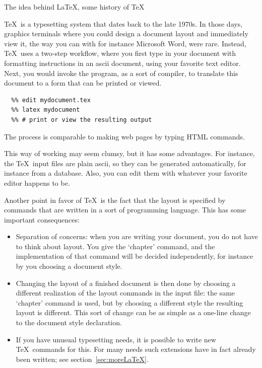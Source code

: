 
 {The idea behind \LaTeX, some history of \TeX}

\TeX\ is a typesetting system that dates back to the late 1970s. In
those days, graphics terminals where you could design a document layout
and immediately view it, the way you can with for instance Microsoft Word, were
rare.  Instead, \TeX\ uses a two-step workflow, where you first type
in your document with formatting instructions in an ascii document,
using your favorite text editor.
%
Next, you would invoke the
 program, as a sort of compiler, to translate this document to
a form that can be printed or viewed. 
\begin{verbatim}
  %% edit mydocument.tex
  %% latex mydocument
  %% # print or view the resulting output
\end{verbatim}
The process is comparable to
making web pages by typing HTML commands.

This way of working may seem clumsy, but
it has some advantages. For instance, the \TeX\ input files are plain
ascii, so they can be generated automatically, for instance
from a database. Also, you can edit them with whatever your
favorite editor happens to be.

Another point in favor of \TeX\ is the fact that the layout is
specified by commands that are written in a sort of programming
language. This has some important consequences:
\begin{itemize}
\item Separation of concerns: when you are writing your document, you
  do not have to think about layout. You give the `chapter' command,
  and the implementation of that command will be decided
  independently, for instance by you choosing a document style.
\item Changing the layout of a finished document is then done by
  choosing a different realization of the layout commands in the input file:
  the same `chapter' command is used, but by choosing a different
  style the resulting layout is
  different. This sort of change can be as simple as 
  a one-line change to the document style declaration.
\item If you have unusual typesetting needs, it is possible to write
  new \TeX\ commands for this. For many needs such extensions have in
  fact already been written; see section~\ref{sec:moreLaTeX}.
\end{itemize}

